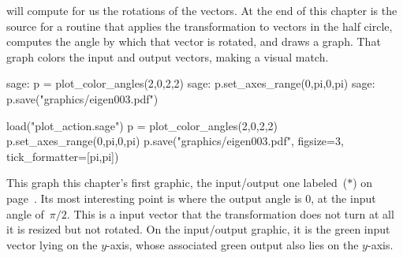 \Sage{} will compute for us the rotations of the vectors.
At the end of this chapter is the source for a routine 
 that
applies the transformation to vectors in the 
half circle, 
computes the angle by which that
vector is rotated, and draws a graph. 
That graph colors the input and output vectors,
making a visual match.
\begin{sagecommandline}
sage: p = plot_color_angles(2,0,2,2)
sage: p.set_axes_range(0,pi,0,pi)
sage: p.save("graphics/eigen003.pdf")
\end{sagecommandline}
\begin{sagesilent}
load("plot_action.sage")  
p = plot_color_angles(2,0,2,2)
p.set_axes_range(0,pi,0,pi)
p.save("graphics/eigen003.pdf", figsize=3, tick_formatter=[pi,pi])
\end{sagesilent}
\begin{center}
\end{center}
This graph this chapter's first graphic, the input/output one labeled~($*$)
on page~\pageref{gr:firstgraphic}.
Its most interesting point is where the output angle is $0$,
at the input angle of~$\pi/2$.
This is a input vector that the transformation does not turn at all\Dash 
it is resized but not rotated.
On the input/output graphic, it is
the green input vector lying on the $y$-axis, whose
associated green output also lies on the $y$-axis.




